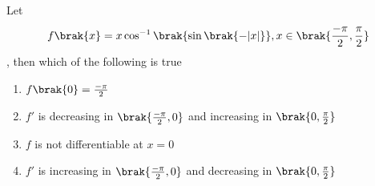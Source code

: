 	\item Let
		\begin{align}
			f\brak{x} = x \cos ^{-1}\brak{\sin \brak{-|x|}}, x \in \brak{\frac{-\pi}{2}, \frac{\pi}{2}}
		\end{align}, then which of the following is true
		
		\hfill{}
		\begin{enumerate}
			\item $f\brak{0} = \frac{-\pi}{2}$ 
			\item $f'$ is decreasing in $\brak{\frac{-\pi}{2}, 0}$ and increasing in $\brak{0, \frac{\pi}{2}}$ 
			\item $f$ is not differentiable at $x = 0$  
			\item $f'$ is increasing in $\brak{\frac{-\pi}{2}, 0}$ and decreasing in $\brak{0, \frac{\pi}{2}}$
		\end{enumerate}


